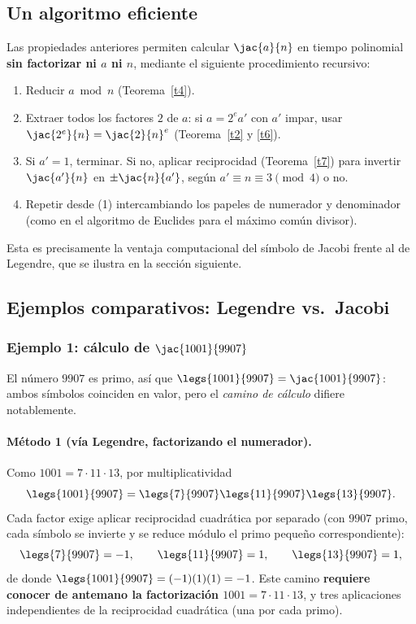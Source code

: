 \subsection{Un algoritmo eficiente}\label{sec:jacobi-alg}

Las propiedades anteriores permiten calcular $\jac{a}{n}$ en tiempo polinomial \textbf{sin factorizar ni $a$ ni $n$}, mediante el siguiente procedimiento recursivo:

\begin{enumerate}[label=(\arabic*)]
\item Reducir $a\bmod n$ (Teorema~\ref{t4}).
\item Extraer todos los factores $2$ de $a$: si $a=2^{e}a'$ con $a'$ impar, usar $\jac{2^{e}}{n}=\jac{2}{n}^{e}$ (Teorema~\ref{t2} y \ref{t6}).
\item Si $a'=1$, terminar. Si no, aplicar reciprocidad (Teorema~\ref{t7}) para invertir $\jac{a'}{n}$ en $\pm\jac{n}{a'}$, según $a'\equiv n\equiv3\pmod4$ o no.
\item Repetir desde (1) intercambiando los papeles de numerador y denominador (como en el algoritmo de Euclides para el máximo común divisor).
\end{enumerate}

Esta es precisamente la ventaja computacional del símbolo de Jacobi frente al de Legendre, que se ilustra en la sección siguiente.

\subsection{Ejemplos comparativos: Legendre vs.\ Jacobi}

\subsubsection{Ejemplo 1: cálculo de $\jac{1001}{9907}$}

El número $9907$ es primo, así que $\legs{1001}{9907}=\jac{1001}{9907}$: ambos símbolos coinciden en valor, pero el \emph{camino de cálculo} difiere notablemente.

\paragraph{Método 1 (vía Legendre, factorizando el numerador).}
Como $1001=7\cdot11\cdot13$, por multiplicatividad
\[
\legs{1001}{9907}=\legs{7}{9907}\legs{11}{9907}\legs{13}{9907}.
\]
Cada factor exige aplicar reciprocidad cuadrática por separado (con $9907$ primo, cada símbolo se invierte y se reduce módulo el primo pequeño correspondiente):
\[
\legs{7}{9907}=-1,\qquad \legs{11}{9907}=1,\qquad \legs{13}{9907}=1,
\]
de donde $\legs{1001}{9907}=(-1)(1)(1)=-1$. Este camino \textbf{requiere conocer de antemano la factorización $1001=7\cdot11\cdot13$}, y tres aplicaciones independientes de la reciprocidad cuadrática (una por cada primo).

